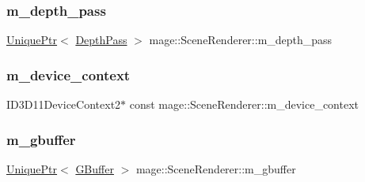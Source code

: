 \hypertarget{classmage_1_1_scene_renderer_abdb26cf0c454d1e5a7fed949191c1044}{}\label{classmage_1_1_scene_renderer_abdb26cf0c454d1e5a7fed949191c1044} 
\subsubsection{\texorpdfstring{m\+\_\+depth\+\_\+pass}{m\_depth\_pass}}
{\footnotesize\ttfamily \hyperlink{namespacemage_a3316d7143a973e37adf1110f2e80ca31}{Unique\+Ptr}$<$ \hyperlink{classmage_1_1_depth_pass}{Depth\+Pass} $>$ mage\+::\+Scene\+Renderer\+::m\+\_\+depth\+\_\+pass\hspace{0.3cm}{\ttfamily [private]}}

\hypertarget{classmage_1_1_scene_renderer_a163ff32807bea62e11fa06c5adf2a291}{}\label{classmage_1_1_scene_renderer_a163ff32807bea62e11fa06c5adf2a291} 
\subsubsection{\texorpdfstring{m\+\_\+device\+\_\+context}{m\_device\_context}}
{\footnotesize\ttfamily I\+D3\+D11\+Device\+Context2$\ast$ const mage\+::\+Scene\+Renderer\+::m\+\_\+device\+\_\+context\hspace{0.3cm}{\ttfamily [private]}}

\hypertarget{classmage_1_1_scene_renderer_ad4a2b9abc762584bd9aceccb5f47b9c4}{}\label{classmage_1_1_scene_renderer_ad4a2b9abc762584bd9aceccb5f47b9c4} 
\subsubsection{\texorpdfstring{m\+\_\+gbuffer}{m\_gbuffer}}
{\footnotesize\ttfamily \hyperlink{namespacemage_a3316d7143a973e37adf1110f2e80ca31}{Unique\+Ptr}$<$ \hyperlink{structmage_1_1_g_buffer}{G\+Buffer} $>$ mage\+::\+Scene\+Renderer\+::m\+\_\+gbuffer\hspace{0.3cm}{\ttfamily [private]}}

